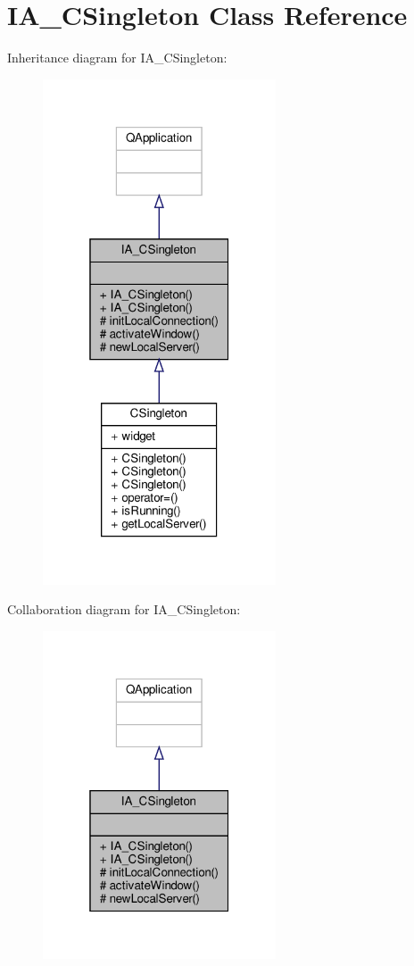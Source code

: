 \hypertarget{classIA__CSingleton}{}\section{I\+A\+\_\+\+C\+Singleton Class Reference}
\label{classIA__CSingleton}


Inheritance diagram for I\+A\+\_\+\+C\+Singleton\+:
\nopagebreak
\begin{figure}[H]
\begin{center}
\leavevmode
\includegraphics[width=196pt]{classIA__CSingleton__inherit__graph}
\end{center}
\end{figure}


Collaboration diagram for I\+A\+\_\+\+C\+Singleton\+:
\nopagebreak
\begin{figure}[H]
\begin{center}
\leavevmode
\includegraphics[width=196pt]{classIA__CSingleton__coll__graph}
\end{center}
\end{figure}
